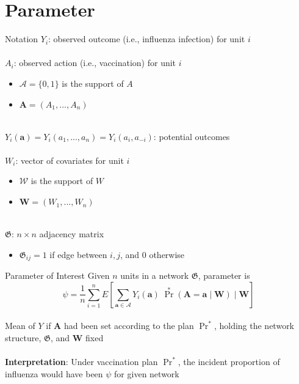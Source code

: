 \documentclass{beamer}
\begin{document}
\section{Parameter}

\begin{frame}{Notation}
	$Y_i$: observed outcome (i.e., influenza infection) for unit $i$ ~\\~\\
	$A_i$: observed action (i.e., vaccination) for unit $i$ ~\\
	\begin{itemize}
		\item $\mathcal{A} = \{0, 1\}$ is the support of $A$
		\item $\mathbf{A} = (A_1, ..., A_n)$
	\end{itemize}
	~\\
	$ Y_i(\mathbf{a}) = Y_i(a_1, ..., a_n) = Y_i(a_i, a_{-i}) $: potential outcomes
	~\\~\\
	$W_i$: vector of covariates for unit $i$ ~\\
	\begin{itemize}
		\item $\mathcal{W}$ is the support of $W$
		\item $\mathbf{W} = (W_1, ..., W_n)$
	\end{itemize}	
	~\\
	$\mathfrak{G}$: $n\times n$ adjacency matrix
	\begin{itemize}
		\item $\mathfrak{G}_{ij} = 1$ if edge between $i,j$, and 0 otherwise
	\end{itemize}
\end{frame}

\begin{frame}{Parameter of Interest}
	Given $n$ units in a network $\mathfrak{G}$, parameter is
	\begin{equation*}
		\psi = \frac{1}{n} \sum_{i=1}^{n} E \left[ \sum_{\mathbf{a} \in \mathbf{\mathcal{A}}} Y_i(\mathbf{a}) \; {\Pr}^*(\mathbf{A} = \mathbf{a} \mid \mathbf{W}) \mid \mathbf{W} \right]
	\end{equation*}
	~\\
	Mean of $Y$ if $\mathbf{A}$ had been set according to the plan ${\Pr}^*$, holding the network structure, $\mathfrak{G}$, and $\mathbf{W}$ fixed
	~\\~\\
	\textbf{Interpretation}: Under vaccination plan ${\Pr}^*$, the incident proportion of influenza would have been $\psi$ for given network
\end{frame}
\end{document}
